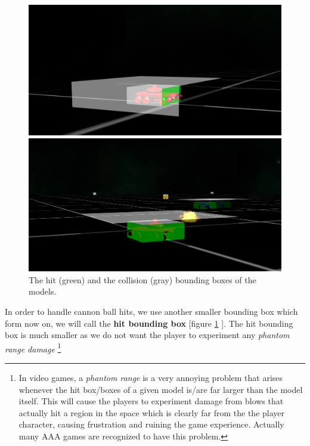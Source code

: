 \documentclass[14pt]{article}
\begin{document}
\begin{figure}[H]
\begin{minipage}[t]{0.5\textwidth}
\center
\includegraphics[width=\textwidth]{images/boundingBoxes.png}
\end{minipage}
\hfill
\begin{minipage}[t]{0.5\textwidth}
\center
\includegraphics[width=\textwidth]{images/boundingBoxes2.png}
\end{minipage} 
\caption{The hit (green) and the collision (gray) bounding boxes of the models.}
\label{img:boundingBoxes}
\end{figure}


In order to handle cannon ball hits, we use another smaller bounding box which form now on, we will call the \textbf{hit bounding box} [figure \ref{img:boundingBoxes} ]. The hit bounding box is much smaller as we do not want the player to experiment any \textit{phantom range damage}
\footnote{In video games, a \textit{phantom range} is a very annoying problem that arises whenever the hit box/boxes of a given model is/are far larger than the model itself. This will cause the players to experiment damage from blows that actually hit a region in the space which is clearly far from the the player character, causing frustration and ruining the game experience. Actually many AAA games are recognized to have this problem.}
\end{document}
